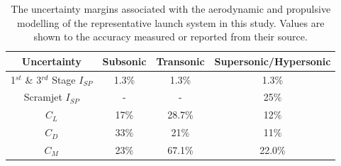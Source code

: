 
\begin{table}[ht]
	\centering
	\begin{tabular}{|c|c|c|c|}
		\hline  Uncertainty & Subsonic & Transonic  & Supersonic/Hypersonic \\ 
		\hline  1$^{st}$ \& 3$^{rd}$ Stage $I_{SP}$ & 1.3\% & 1.3\% &  1.3\% \\ 
		\hline  Scramjet $I_{SP}$ & - & - &  25\% \\ 
		\hline   $C_L$ & 17\% & 28.7\% & 12\% \\  
		\hline   $C_D$ & 33\% & 21\% & 11\% \\  
		\hline   $C_M$  & 23\% & 67.1\% &  22.0\% \\ 
		\hline 
	\end{tabular}
	\caption{The uncertainty margins associated with the aerodynamic and propulsive modelling of the representative launch system in this study. Values are shown to the accuracy measured or reported from their source.}
	\label{tab:AppendixUncertainty}
\end{table}



